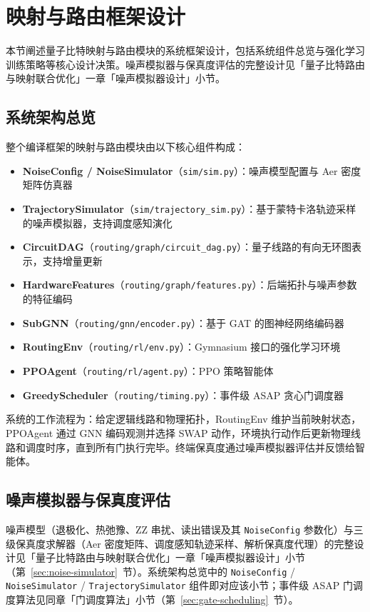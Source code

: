 \newpage
\section{映射与路由框架设计}

本节阐述量子比特映射与路由模块的系统框架设计，包括系统组件总览与强化学习训练策略等核心设计决策。噪声模拟器与保真度评估的完整设计见「量子比特路由与映射联合优化」一章「噪声模拟器设计」小节。

\subsection{系统架构总览}

整个编译框架的映射与路由模块由以下核心组件构成：

\begin{itemize}
  \item \textbf{NoiseConfig / NoiseSimulator}（\texttt{sim/sim.py}）：噪声模型配置与 Aer 密度矩阵仿真器
  \item \textbf{TrajectorySimulator}（\texttt{sim/trajectory\_sim.py}）：基于蒙特卡洛轨迹采样的噪声模拟器，支持调度感知演化
  \item \textbf{CircuitDAG}（\texttt{routing/graph/circuit\_dag.py}）：量子线路的有向无环图表示，支持增量更新
  \item \textbf{HardwareFeatures}（\texttt{routing/graph/features.py}）：后端拓扑与噪声参数的特征编码
  \item \textbf{SubGNN}（\texttt{routing/gnn/encoder.py}）：基于 GAT 的图神经网络编码器
  \item \textbf{RoutingEnv}（\texttt{routing/rl/env.py}）：Gymnasium 接口的强化学习环境
  \item \textbf{PPOAgent}（\texttt{routing/rl/agent.py}）：PPO 策略智能体
  \item \textbf{GreedyScheduler}（\texttt{routing/timing.py}）：事件级 ASAP 贪心门调度器
\end{itemize}

系统的工作流程为：给定逻辑线路和物理拓扑，RoutingEnv 维护当前映射状态，PPOAgent 通过 GNN 编码观测并选择 SWAP 动作，环境执行动作后更新物理线路和调度时序，直到所有门执行完毕。终端保真度通过噪声模拟器评估并反馈给智能体。

\subsection{噪声模拟器与保真度评估}

噪声模型（退极化、热弛豫、ZZ 串扰、读出错误及其 \texttt{NoiseConfig} 参数化）与三级保真度求解器（Aer 密度矩阵、调度感知轨迹采样、解析保真度代理）的完整设计见「量子比特路由与映射联合优化」一章「噪声模拟器设计」小节（第~\ref{sec:noise-simulator}~节）。系统架构总览中的 \texttt{NoiseConfig} / \texttt{NoiseSimulator} / \texttt{TrajectorySimulator} 组件即对应该小节；事件级 ASAP 门调度算法见同章「门调度算法」小节（第~\ref{sec:gate-scheduling}~节）。

